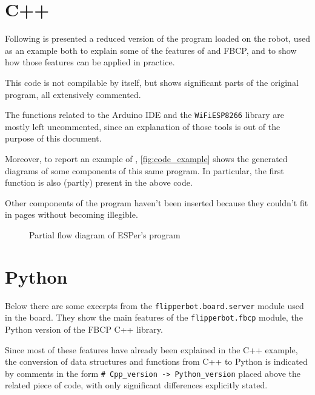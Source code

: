 \section{C++}
Following is presented a reduced version of the program loaded on the robot,
used as an example both to explain some of the features of \ScheMo{} and FBCP,
and to show how those features can be applied in practice.

This code is not compilable by itself, but shows significant parts of the
original program, all extensively commented.

The functions related to the Arduino IDE and the \Verb|WiFiESP8266| library are
mostly left uncommented, since an explanation of those tools is out of the
purpose of this document.



Moreover, to report an example of \ScheMoTeX{}, \autoref{fig:code_example} shows the
generated diagrams of some components of this same program. In particular,
the first function is also (partly) present in the above code.

Other components of the program haven't been inserted because they couldn't fit
in pages without becoming illegible.

\begin{figure}[hp]
  
  \caption{Partial flow diagram of ESPer's program}
  \label{fig:code_example}
\end{figure}

\section{Python}
Below there are some excerpts from the \Verb|flipperbot.board.server| module
used in the board. They show the main features of the \Verb|flipperbot.fbcp|
module, the Python version of the FBCP C++ library.

Since most of these features have already been explained in the C++ example,
the conversion of data structures and functions from C++ to Python is indicated
by comments in the form \Verb|# Cpp_version -> Python_version| placed above the
related piece of code, with only significant differences explicitly stated.


